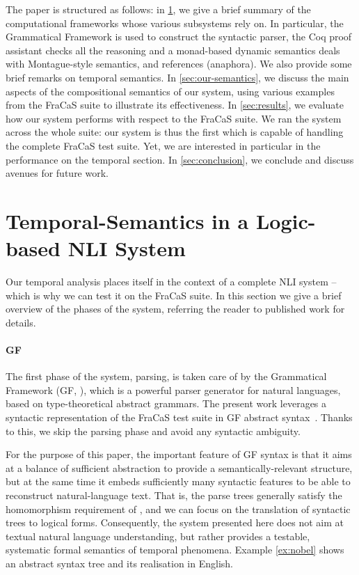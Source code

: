 \documentclass[11pt,a4paper]{article}
\begin{document}
The paper is structured as follows: in \cref{sec:background}, we give
a brief summary of the computational frameworks whose various
subsystems rely on. In particular, the Grammatical Framework is used
to construct the syntactic parser, the Coq proof assistant checks all
the reasoning and a monad-based dynamic semantics deals with
Montague-style semantics, and references (anaphora).  We also provide
some brief remarks on temporal semantics. In \cref{sec:our-semantics},
we discuss the main aspects of the compositional semantics of our
system, using various examples from the FraCaS suite to illustrate its
effectiveness. In \cref{sec:results}, we evaluate how our system
performs with respect to the FraCaS suite. We ran the system across
the whole suite: our system is thus the first which is capable of
handling the complete FraCaS test suite.  Yet, we are interested in
particular in the performance on the temporal section. In
\cref{sec:conclusion}, we conclude and discuss avenues for future
work.


\section{Temporal-Semantics in a Logic-based NLI System}
\label{sec:background}

Our temporal analysis places itself in the context of a complete NLI
system -- which is why we can test it on the FraCaS suite. In this
section we give a brief overview of the phases of the system,
referring the reader to published work for details.

\paragraph{GF}
The first phase of the system, parsing, is taken care of by the 
Grammatical Framework (GF, \citet{ranta_grammatical_2004}), which is a
powerful parser generator for natural languages, based on
type-theoretical abstract grammars.  The present work leverages a
syntactic representation of the FraCaS test suite in GF abstract
syntax~\citep{Ljunglof:2012}. Thanks to this, we skip the parsing
phase and avoid any syntactic ambiguity.

For the purpose of this paper, the important feature of GF
syntax is that it aims at a balance of sufficient abstraction to provide a
semantically-relevant structure, but at the same time it embeds
sufficiently many syntactic features to be able to reconstruct
natural-language text. That is, the parse trees generally satisfy the
homomorphism requirement of \citet{montague_english_1970,montague_proper_1974}, and
we can focus on the translation of syntactic trees to logical forms.
%
Consequently, the system presented
here does not aim at textual natural language understanding, but rather
provides a testable, systematic formal semantics of temporal phenomena.
Example \ref{ex:nobel} shows an abstract syntax tree and its
realisation in English.
\end{document}
